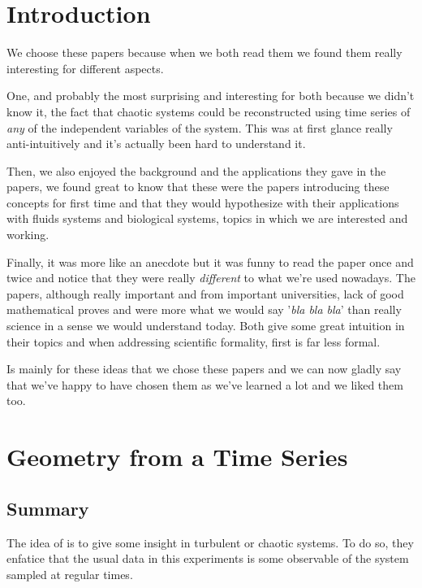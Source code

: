 \documentclass[10pt]{article}
\begin{document}
\maketitle

\section{Introduction}

We choose these papers because when we both read them we found them really interesting for different aspects. 

One, and probably the most surprising and interesting for both because we didn't know it, the fact that chaotic systems could be reconstructed using time series of \textit{any} of the independent variables of the system. This was at first glance really anti-intuitively and it's actually been hard to understand it.

Then, we also enjoyed the background and the applications they gave in the papers, we found great to know that these were the papers introducing these concepts for first time and that they would hypothesize with their applications with fluids systems and biological systems, topics in which we are interested and working.

Finally, it was more like an anecdote but it was funny to read the paper once and twice and notice that they were really \textit{different} to what we're used nowadays. The papers, although really important and from important universities, lack of good mathematical proves and were more what we would say '\textit{bla bla bla}' than really science in a sense we would understand today. Both give some great intuition in their topics and when addressing scientific formality, first is far less formal.

Is mainly for these ideas that we chose these papers and we can now gladly say that we've happy to have chosen them as we've learned a lot and we liked them too.

\section{Geometry from a Time Series}

\subsection{Summary}

The idea of \cite{paper1} is to give some insight in turbulent or chaotic systems. To do so, they enfatice that the usual data in this experiments is some observable of the system sampled at regular times. 
\end{document}

